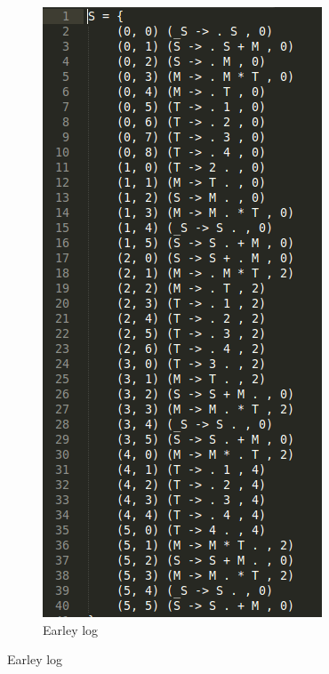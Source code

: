 \documentclass{beamer}
\begin{document}
\begin{frame}
\begin{figure}
\begin{subfigure}[b]{0.3\textwidth}
        \includegraphics[height=0.75\textheight]{LogEarley.png}
        \caption{Earley log}
        \label{fig:earley}
    \end{subfigure}
\end{figure}
 \end{frame}
\end{document}
